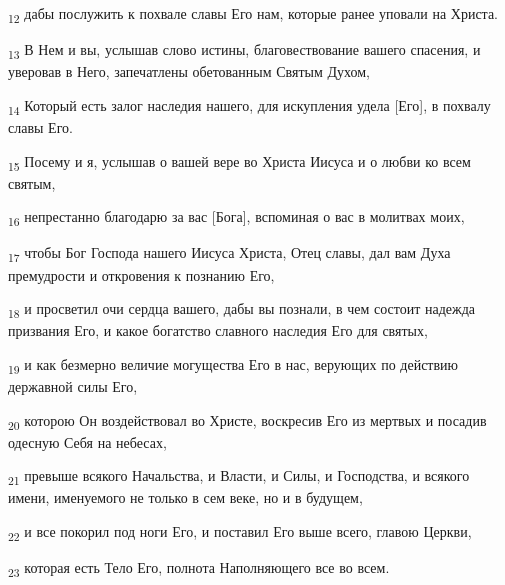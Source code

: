 \begin{tcolorbox}
\textsubscript{12} дабы послужить к похвале славы Его нам, которые ранее уповали на Христа.
\end{tcolorbox}
\begin{tcolorbox}
\textsubscript{13} В Нем и вы, услышав слово истины, благовествование вашего спасения, и уверовав в Него, запечатлены обетованным Святым Духом,
\end{tcolorbox}
\begin{tcolorbox}
\textsubscript{14} Который есть залог наследия нашего, для искупления удела [Его], в похвалу славы Его.
\end{tcolorbox}
\begin{tcolorbox}
\textsubscript{15} Посему и я, услышав о вашей вере во Христа Иисуса и о любви ко всем святым,
\end{tcolorbox}
\begin{tcolorbox}
\textsubscript{16} непрестанно благодарю за вас [Бога], вспоминая о вас в молитвах моих,
\end{tcolorbox}
\begin{tcolorbox}
\textsubscript{17} чтобы Бог Господа нашего Иисуса Христа, Отец славы, дал вам Духа премудрости и откровения к познанию Его,
\end{tcolorbox}
\begin{tcolorbox}
\textsubscript{18} и просветил очи сердца вашего, дабы вы познали, в чем состоит надежда призвания Его, и какое богатство славного наследия Его для святых,
\end{tcolorbox}
\begin{tcolorbox}
\textsubscript{19} и как безмерно величие могущества Его в нас, верующих по действию державной силы Его,
\end{tcolorbox}
\begin{tcolorbox}
\textsubscript{20} которою Он воздействовал во Христе, воскресив Его из мертвых и посадив одесную Себя на небесах,
\end{tcolorbox}
\begin{tcolorbox}
\textsubscript{21} превыше всякого Начальства, и Власти, и Силы, и Господства, и всякого имени, именуемого не только в сем веке, но и в будущем,
\end{tcolorbox}
\begin{tcolorbox}
\textsubscript{22} и все покорил под ноги Его, и поставил Его выше всего, главою Церкви,
\end{tcolorbox}
\begin{tcolorbox}
\textsubscript{23} которая есть Тело Его, полнота Наполняющего все во всем.
\end{tcolorbox}
